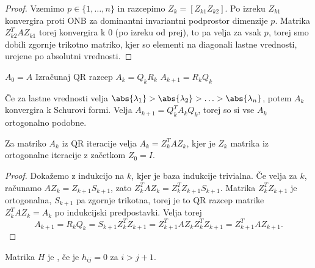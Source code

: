 \begin{proof}
  Vzemimo $p \in \{1, \ldots, n\}$ in razcepimo $Z_k = [Z_{k1} Z_{k2}]$.
  Po izreku $Z_{k1}$ konvergira proti ONB za dominantni invariantni podprostor
  dimenzije $p$.
  Matrika $Z_{k2}^T A Z_{k1}$ torej konvergira k $0$ (po izreku od prej), to pa
  velja za vsak $p$, torej smo dobili zgornje trikotno matriko, kjer so elementi
  na diagonali lastne vrednosti, urejene po absolutni vrednosti.
\end{proof}



\begin{algorithm}
  \caption{QR iteracija}
  \label{alg:qr-iteracija}
  \begin{algorithmic}
	\State $A_0 = A$
	\State Izračunaj QR razcep $A_k = Q_k R_k$
	\State $A_{k+1} = R_k Q_k$
	\EndFor
  \end{algorithmic}
\end{algorithm}

Če za lastne vrednosti velja $\abs{\lambda_1} > \abs{\lambda_2} > \ldots > \abs{\lambda_n}$, potem $A_k$
konvergira k Schurovi formi.
Velja $A_{k+1} = Q_k^T A_k Q_k$, torej so si vse $A_k$ ortogonalno podobne.

\begin{izrek}
  Za matriko $A_k$ iz QR iteracije velja $A_k = Z_k^T A Z_k$, kjer je $Z_k$ matrika iz
  ortogonalne iteracije z začetkom $Z_0 = I$.
\end{izrek}

\begin{proof}
  Dokažemo z indukcijo na $k$, kjer je baza indukcije trivialna.
  Če velja za $k$, računamo $A Z_k = Z_{k+1} S_{k+1}$, zato $Z_k^T A Z_k = Z_k^T Z_{k+1}
  S_{k+1}$.
  Matrika $Z_k^T Z_{k+1}$ je ortogonalna, $S_{k+1}$ pa zgornje trikotna, torej je to
  QR razcep matrike $Z_k^T A Z_k = A_k$ po indukcijski predpostavki.
  Velja torej
  \[
	A_{k+1} = R_k Q_k = S_{k+1} Z_k^T Z_{k+1} = Z_{k+1}^T A Z_k Z_k^T Z_{k+1} = Z_{k+1}^T A Z_{k+1}.
  \]
\end{proof}


\begin{definicija}
  Matrika $H$ je , če je $h_{ij} = 0$ za $i > j+1$.
\end{definicija}

